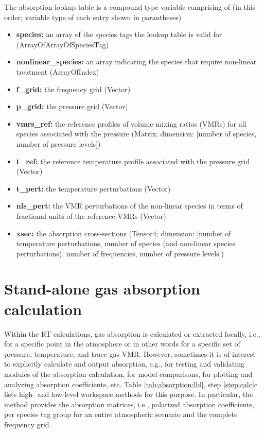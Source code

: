 The absorption lookup table is a compound type variable comprising of (in this
order; variable type of each entry shown in parantheses)
\begin{itemize}
\item \textbf{species:} an array of the species tags the lookup table is valid for
(ArrayOfArrayOfSpeciesTag)
\item \textbf{nonlinear\_species:} an array indicating the species that require non-linear treatment
(ArrayOfIndex)
\item \textbf{f\_grid:} the frequency grid (Vector)
\item \textbf{p\_grid:} the pressure grid (Vector)
\item \textbf{vmrs\_ref:} the reference profiles of volume mixing ratios (VMRs) for all species
associated with the pressure (Matrix; dimension: [number of species, number of
pressure levels])
\item \textbf{t\_ref:} the reference temperature profile associated with the
pressure grid (Vector)
\item \textbf{t\_pert:} the temperature perturbations (Vector)
\item \textbf{nls\_pert:} the VMR perturbations of the non-linear species in
terms of fractional units of the reference VMRs (Vector)
\item \textbf{xsec:} the absorption cross-sections (Tensor4; dimension: [number
of temperature perturbations, number of species (and non-linear species
perturbations), number of frequencies, number of pressure levels])
\end{itemize}

\section{Stand-alone gas absorption calculation}
\label{sec:absorption:abs-only}

Within the RT calculations, gas absorption is calculated or extracted locally,
i.e., for a specific point in the atmosphere or in other words for a specific
set of pressure, temperature, and trace gas VMR. However, sometimes it is of
interest to explicitly calculate and output absorption, e.g., for testing and
validating modules of the absorption calculation,  for model comparisons, for
plotting and analyzing absorption coefficients, etc.
Table \ref{tab:absorption:lbl}, step \ref{step:calc}c lists high- and low-level
workspace methods for this purpose.
In particular, the method  provides the
absorption matrices, i.e., polarized absorption coefficients, per species tag
group for an entire atmospheric scenario and the complete frequency grid.



